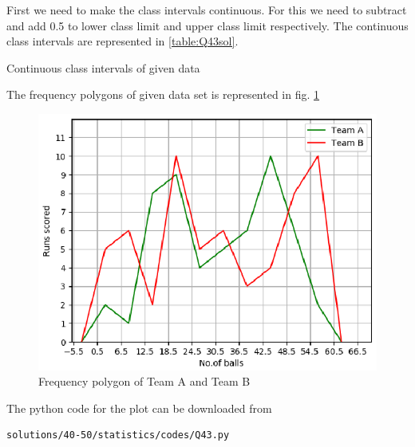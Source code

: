  First we need to make the class intervals continuous. For this we need to subtract and add 0.5 to lower class limit and upper class limit respectively. The continuous class intervals are represented in \ref{table:Q43sol}.
\begin{table}[!ht]
\centering

\caption{Continuous class intervals of given data}
\label{table:Q43sol}	
\end{table}
 The frequency polygons of given data set is represented in fig. \ref{fig:43_freqpoly2}
\begin{figure}[!ht]
\centering
\includegraphics[width= \columnwidth]{./solutions/40-50/statistics/figs/Q43.eps}
\caption{Frequency polygon of Team A and Team B}
\label{fig:43_freqpoly2}
\end{figure}
 The python code for the plot can be downloaded from
\begin{lstlisting}
solutions/40-50/statistics/codes/Q43.py
\end{lstlisting}

